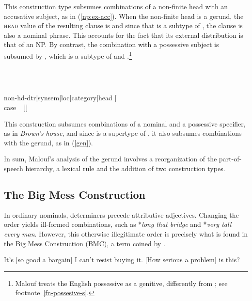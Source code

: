\documentclass[output=paper
	        ,collection
	        ,collectionchapter
 	        ,biblatex
                ,babelshorthands
                ,newtxmath
                ,draftmode
                ,colorlinks, citecolor=brown
]{langscibook}
\begin{document}
\noindent
This construction type subsumes combinations of a non-finite head with 
an accusative subject, as in (\ref{np:ex-acc}). When the non-finite head is a gerund, 
the \textsc{head} value of the resulting clause is  
and since that is a subtype of , the clause is also a nominal phrase. 
This accounts for the fact that its external distribution is that of an NP.  
By contrast, the combination with a possessive subject is subsumed by 
, which is a subtype of  and 
 \citep[16]{Malouf00}.\footnote{Malouf treats 
the English possessive as a genitive, differently from \citet[]{SagWasow03}; see
footnote~\ref{fn-possesive-s}.}

\begin{exe} 
\ex\label{gencx} 
 ~ \impl ~ 
\begin{avm} 
[synsem|loc [category|head ~ \type{noun}                \\
             content ~ \type{scope-object}]             \\
 non-hd-dtr|synsem|loc|category|head [       \\
                                      case ~ ]] 
\end{avm}
\end{exe}
 
\noindent
This construction subsumes combinations of a nominal and a 
possessive specifier, as in \emph{Brown's house}, and since 
 is a supertype of ,  
it also subsumes combinations with the gerund, as in (\ref{gen}). 

In sum, Malouf's analysis of the gerund involves a reorganization of the 
part-of-speech hierarchy, a lexical rule and the addition of two construction types.     



\subsection{The Big Mess Construction} 
\label{bime}  


In ordinary nominals, determiners precede attributive adjectives. Changing the order 
yields ill-formed combinations, such as *\emph{long that bridge} and *\emph{very tall every man}. 
However, this otherwise illegitimate order is precisely what is found in 
the Big Mess Construction (BMC), a term coined by \citet{Berman74}.  

\begin{exe}
\ex\label{bigme}
\begin{xlist}
\ex   It's [so good a bargain] I can't resist buying it.
\ex   {}[How serious a problem] is this?
\end{xlist}
\end{exe} 
\end{document}
